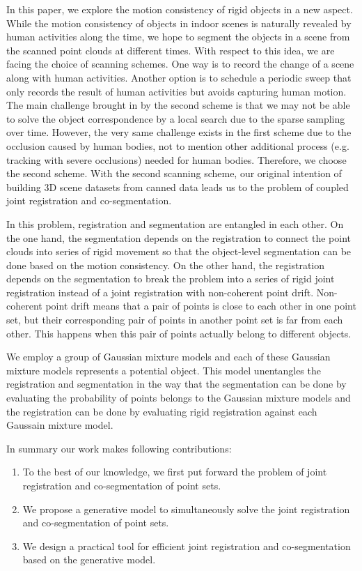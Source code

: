 In this paper, we explore the motion consistency of rigid objects in a new aspect.
While the motion consistency of objects in indoor scenes is naturally revealed by human activities along the time, we hope to segment the objects in a scene from the scanned point clouds at different times. 
With respect to this idea, we are facing the choice of scanning schemes. One way is to record the change of a scene along with human activities. Another option is to schedule a periodic sweep that only records the result of human activities but avoids capturing human motion. The main challenge brought in by the second scheme is that we may not be able to solve the object correspondence by a local search due to the sparse sampling over time. However, the very same challenge exists in the first scheme due to the occlusion caused by human bodies, not to mention other additional process (e.g. tracking with severe occlusions) needed for human bodies.
Therefore, we choose the second scheme. With the second scanning scheme, our original intention of building 3D scene datasets from canned data leads us to the problem of coupled joint registration and co-segmentation.


In this problem, registration and segmentation are entangled in each other. On the one hand, the segmentation depends on the registration to connect the point clouds into series of rigid movement so that the object-level segmentation can be done based on the motion consistency. On the other hand, the registration depends on the segmentation to break the problem into a series of rigid joint registration instead of a joint registration with non-coherent point drift. Non-coherent point drift means that a pair of points is close to each other in one point set, but their corresponding pair of points in another point set is far from each other. 
This happens when this pair of points actually belong to different objects.

We employ a group of Gaussian mixture models and each of these Gaussian mixture models represents a potential object. 
This model unentangles the registration and segmentation in the way that the segmentation can be done by evaluating the probability of points belongs to the Gaussian mixture models and the registration can be done by evaluating rigid registration against each Gaussain mixture model.


In summary our work makes following contributions: 
\begin{enumerate}
	\item To the best of our knowledge, we first put forward the problem of joint registration and co-segmentation of point sets.
	
	\item We propose a generative model to simultaneously solve the joint registration and co-segmentation of point sets.
	
	\item We design a practical tool for efficient joint registration and co-segmentation based on the generative model. 
	
\end{enumerate}